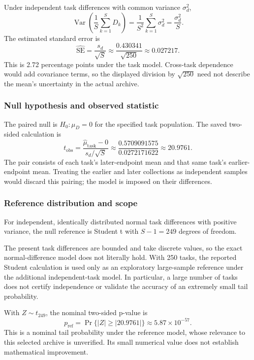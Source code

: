 Under independent task differences with common variance $\sigma_d^2$,
\[
\operatorname{Var}\!\left(\frac{1}{S}\sum_{k=1}^{S}D_k\right)
=\frac{1}{S^2}\sum_{k=1}^{S}\sigma_d^2
=\frac{\sigma_d^2}{S}.
\]
The estimated standard error is
\[
\widehat{\mathrm{SE}}=\frac{s_d}{\sqrt S}
\approx\frac{0.430341}{\sqrt{250}}\approx0.027217.
\]
This is 2.72 percentage points under the task model. Cross-task dependence would add covariance terms, so the displayed division by $\sqrt{250}$ need not describe the mean's uncertainty in the actual archive.

\subsubsection{Null hypothesis and observed statistic}
The paired null is $H_0:\mu_D=0$ for the specified task population. The saved two-sided calculation is\cite{nistpaired,scipyttest}
\begin{equation}
t_{\mathrm{obs}}=\frac{\widehat\mu_{\mathrm{task}}-0}{s_d/\sqrt S}
\approx\frac{0.5709091575}{0.0272171622}\approx20.9761.
\label{eq:paired-t-worked}
\end{equation}
The pair consists of each task's later-endpoint mean and that same task's earlier-endpoint mean. Treating the earlier and later collections as independent samples would discard this pairing; the model is imposed on their differences.

\subsubsection{Reference distribution and scope}
For independent, identically distributed normal task differences with positive variance, the null reference is Student t with $S-1=249$ degrees of freedom.

The present task differences are bounded and take discrete values, so the exact normal-difference model does not literally hold. With 250 tasks, the reported Student calculation is used only as an exploratory large-sample reference under the additional independent-task model. In particular, a large number of tasks does not certify independence or validate the accuracy of an extremely small tail probability.

With $Z\sim t_{249}$, the nominal two-sided p-value is
\[
p_{\mathrm{ref}}=\Pr\{|Z|\geq |20.9761|\}
\approx5.87\times10^{-57}.
\]
This is a nominal tail probability under the reference model, whose relevance to this selected archive is unverified. Its small numerical value does not establish mathematical improvement.

